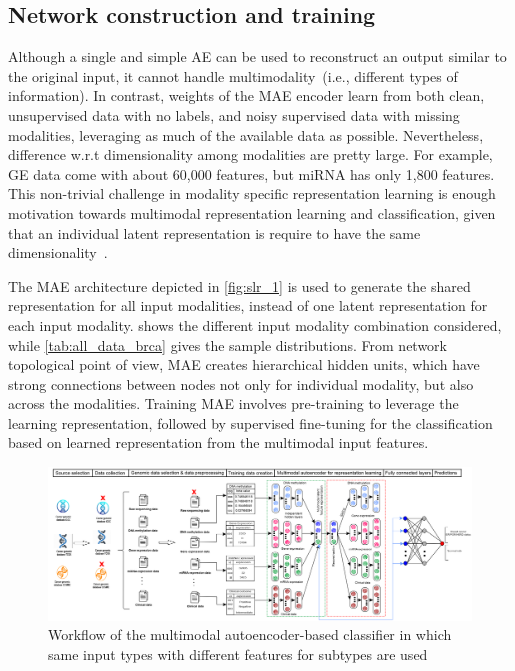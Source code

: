 \subsection{Network construction and training}
Although a single and simple AE can be used to reconstruct an output similar to the original input, it cannot handle multimodality~(i.e., different types of information). In contrast, weights of the MAE encoder learn from both clean, unsupervised data with no labels, and noisy supervised data with missing modalities, leveraging as much of the available data as possible.
Nevertheless, difference w.r.t dimensionality among modalities are pretty large. For example, GE data come with about 60,000 features, but miRNA has only 1,800 features. This non-trivial challenge in modality specific representation learning is enough motivation towards multimodal representation learning and classification, given that an individual latent representation is require to have the same dimensionality~\cite{mmdcae}.

\hspace*{3.5mm} The MAE architecture depicted in \cref{fig:slr_1} is used to generate the shared representation for all input modalities, instead of one latent representation for each input modality.  shows the different input modality combination considered, while \cref{tab:all_data_brca} gives the sample distributions. From network topological point of view, MAE creates hierarchical hidden units, which have strong connections between nodes not only for individual modality, but also across the modalities.  
Training MAE involves pre-training to leverage the learning representation, followed by supervised fine-tuning for the classification based on learned  representation from the multimodal input features. 

\begin{figure}
	\centering
	\includegraphics[scale=0.75]{images/mae_v2.png}
	\caption[Workflow of the multimodal autoencoder classifier]{Workflow of the multimodal autoencoder-based classifier in which same input types with different features for subtypes %
	are used~\cite{karimACCESS2019}}
	\label{fig:wf_mae}
\end{figure}

